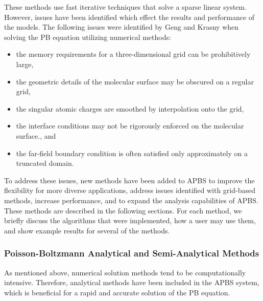 \documentclass[journal=jpcbfk, manuscript=article]{achemso}
\begin{document}
These methods use fast iterative techniques that solve a sparse linear system. However, issues have been identified which effect the results and performance of the models. The following issues were identified by Geng and Krasny \cite{geng2013} when solving the PB equation utilizing numerical methods:
%
\begin{itemize}
	\itemsep-0.25em
	\item the memory requirements for a three-dimensional grid can be prohibitively large,
	\item the geometric details of the molecular surface may be obscured on a regular grid,
	\item the singular atomic charges are smoothed by interpolation onto the grid,
	\item the interface conditions may not be rigorously enforced on the molecular surface., and
	\item the far-field boundary condition is often satisfied only approximately on a truncated domain.
\end{itemize}
%
To address these issues, new methods have been added to APBS to improve the flexibility for more diverse applications, address issues identified with grid-based methods, increase performance, and to expand the analysis capabilities of APBS. These methods are described in the following sections. For each method, we briefly discuss the algorithms that were implemented, how a user may use them, and show example results for several of the methods.

\subsubsection{Poisson-Boltzmann Analytical and Semi-Analytical Methods}
As mentioned above, numerical solution methods tend to be computationally intensive. Therefore, analytical methods have been included in the APBS system, which is beneficial for a rapid and accurate solution of the PB equation.
\end{document}
